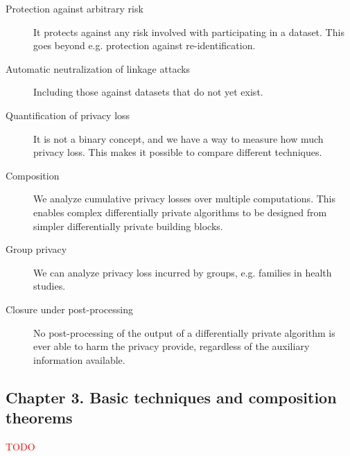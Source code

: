\documentclass[a4paper]{article}
\begin{document}
\begin{description}
    \item[Protection against arbitrary risk] It protects against any risk involved with participating in a dataset. This goes beyond e.g. protection against re-identification.
    
    \item[Automatic neutralization of linkage attacks] Including those against datasets that do not yet exist.
    
    \item[Quantification of privacy loss] It is not a binary concept, and we have a way to measure how much privacy loss. This makes it possible to compare different techniques.
    
    \item[Composition] We analyze cumulative privacy losses over multiple computations. This enables complex differentially private algorithms to be designed from simpler differentially private building blocks.
    
    \item[Group privacy] We can analyze privacy loss incurred by groups, e.g. families in health studies.
    
    \item[Closure under post-processing] No post-processing of the output of a differentially private algorithm is ever able to harm the privacy provide, regardless of the auxiliary information available.
\end{description}

\subsection{Chapter 3. Basic techniques and composition theorems}

\textcolor{red}{TODO}
\end{document}
